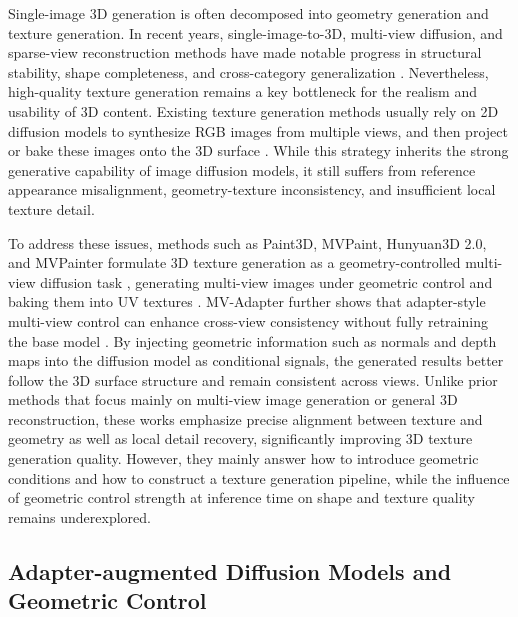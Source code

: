 \documentclass[times,twocolumn,final]{elsarticle}
\providecommand{\DIFadd}[1]{{\protect\color{blue} \sf #1}} %
\providecommand{\DIFdel}[1]{{\protect\color{red} \scriptsize #1}} %
\providecommand{\DIFaddbegin}{} %
\providecommand{\DIFaddend}{} %
\providecommand{\DIFdelbegin}{} %
\providecommand{\DIFdelend}{} %
\newcommand{\DIFscaledelfig}{0.5}
\newlength{\DIFdelgraphicswidth} %
\newlength{\DIFdelgraphicsheight} %
\newcommand{\DIFaddincludegraphics}[2][]{{\color{blue}\fbox{\DIFOincludegraphics[#1]{#2}}}} %
\newcommand{\DIFdelincludegraphics}[2][]{%
\sbox{\DIFdelgraphicsbox}{\DIFOincludegraphics[#1]{#2}}%
\settoboxwidth{\DIFdelgraphicswidth}{\DIFdelgraphicsbox} %
\settoboxtotalheight{\DIFdelgraphicsheight}{\DIFdelgraphicsbox} %
\scalebox{\DIFscaledelfig}{%
\parbox[b]{\DIFdelgraphicswidth}{\usebox{\DIFdelgraphicsbox}\\[-\baselineskip] \rule{\DIFdelgraphicswidth}{0em}}\llap{\resizebox{\DIFdelgraphicswidth}{\DIFdelgraphicsheight}{%
\setlength{\unitlength}{\DIFdelgraphicswidth}%
\begin{picture}(1,1)%
\thicklines\linethickness{2pt} %
{\color[rgb]{1,0,0}\put(0,0){\framebox(1,1){}}}%
{\color[rgb]{1,0,0}\put(0,0){\line( 1,1){1}}}%
{\color[rgb]{1,0,0}\put(0,1){\line(1,-1){1}}}%
\end{picture}%
}\hspace*{3pt}}} %
} %
\DeclareRobustCommand{\DIFaddbegin}{\DIFOaddbegin \let\includegraphics\DIFaddincludegraphics} %
\DeclareRobustCommand{\DIFaddend}{\DIFOaddend \let\includegraphics\DIFOincludegraphics} %
\DeclareRobustCommand{\DIFdelbegin}{\DIFOdelbegin \let\includegraphics\DIFdelincludegraphics} %
\DeclareRobustCommand{\DIFdelend}{\DIFOaddend \let\includegraphics\DIFOincludegraphics} %
\begin{document}
Single-image 3D generation is often decomposed into geometry generation and texture generation. In recent years, single-image-to-3D, multi-view diffusion, and sparse-view reconstruction methods have made notable progress in structural stability, shape completeness, and cross-category generalization \cite{liu2023zero1to3,shi2023zero123pp,liu2023syncdreamer,long2023wonder3d,shi2024mvdream,wang2023imagedream,xu2024instantmesh,ke2024era3d}. Nevertheless, high-quality texture generation remains a key bottleneck for the realism and usability of 3D content. Existing texture generation methods usually rely on 2D diffusion models to synthesize RGB images from multiple views, and then project or bake these images onto the 3D surface \cite{chen2023text2tex,richardson2023texture,poole2023dreamfusion,chen2023fantasia3d}. While this strategy inherits the strong generative capability of image diffusion models, it still suffers from reference appearance misalignment, geometry-texture inconsistency, and insufficient local texture detail.

To address these issues, methods such as \DIFaddbegin \DIFadd{Paint3D, MVPaint, Hunyuan3D 2.0, and }\DIFaddend MVPainter formulate 3D texture generation as a geometry-controlled multi-view diffusion task\DIFdelbegin \DIFdel{\cite{shao2025mvpainter}}\DIFdelend \DIFaddbegin \DIFadd{, generating multi-view images under geometric control and baking them into UV textures \cite{zeng2024paint3d,cheng2024mvpaint,lai2025hunyuan3d,shao2025mvpainter}}\DIFaddend . MV-Adapter further shows that adapter-style multi-view control can enhance cross-view consistency without fully retraining the base model \cite{huang2024mvadapter}. By injecting geometric information such as normals and depth maps into the diffusion model as conditional signals, the generated results better follow the 3D surface structure and remain consistent across views. Unlike prior methods that focus mainly on multi-view image generation or general 3D reconstruction, these works emphasize precise alignment between texture and geometry as well as local detail recovery, significantly improving 3D texture generation quality. However, they mainly answer how to introduce geometric conditions and how to construct a texture generation pipeline, while the influence of geometric control strength at inference time on shape and texture quality remains underexplored.

\subsection{Adapter-augmented Diffusion Models and Geometric Control}
\label{subsec:adapter}
\end{document}
